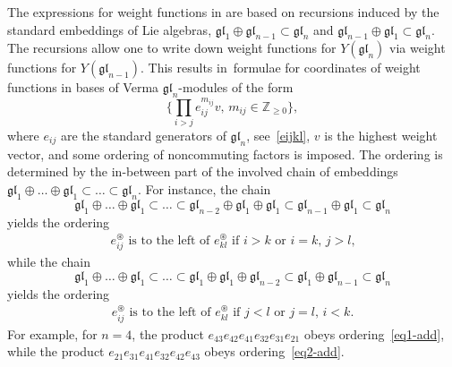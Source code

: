 \documentclass[pdftex]{sigma}
\numberwithin{equation}{section}
\begin{document}
The expressions for weight functions in \cite{TVC} are based on recursions
induced by the standard embeddings of Lie algebras,
$\mathfrak{gl}_1\oplus \mathfrak{gl}_{n-1}\subset \mathfrak{gl}_n$ and
$\mathfrak{gl}_{n-1}\oplus \mathfrak{gl}_1 \subset \mathfrak{gl}_n$. The recursions
allow one to write down weight functions for $Y(\mathfrak{gl}_n)$ via weight functions for
$Y(\mathfrak{gl}_{n-1})$. This results in~formulae for coordinates of weight functions in bases
of Verma $\mathfrak{gl}_n$-modules of the form
\begin{equation}\label{basis}
\biggl\{ \prod_{i>j} e_{ij}^{m_{ij}}v, \,
m_{ij}\in\mathbb{Z}_{\geq0}\biggr\},
\end{equation}
where $e_{ij}$ are the standard generators of $\mathfrak{gl}_n$, see~\eqref{eijkl},
$v$ is the highest weight
vector, and some ordering of noncommuting factors is imposed. The ordering is determined
by the in-between part of the involved chain of embeddings
$\mathfrak{gl}_1 \oplus\dots\oplus \mathfrak{gl}_1\subset\dots\subset\mathfrak{gl}_n$.
For instance, the chain
\[\mathfrak{gl}_1 \oplus\dots\oplus \mathfrak{gl}_1\subset
\dots\subset\mathfrak{gl}_{n-2}\oplus \mathfrak{gl}_1 \oplus \mathfrak{gl}_1 \subset
\mathfrak{gl}_{n-1}\oplus \mathfrak{gl}_1 \subset \mathfrak{gl}_n
\]
yields the ordering
\begin{gather}\label{eq1-add}
\text{$e_{ij}^\circledast$ is to the left of $e_{kl}^\circledast$ if $i>k$ or $i=k$, $j>l$,}
\end{gather}
while the chain
\[
\mathfrak{gl}_1 \oplus\dots\oplus \mathfrak{gl}_1
\subset\dots\subset\mathfrak{gl}_1 \oplus \mathfrak{gl}_1\oplus\mathfrak{gl}_{n-2} \subset
\mathfrak{gl}_1\oplus \mathfrak{gl}_{n-1}\subset \mathfrak{gl}_n
\]
yields the ordering
\begin{gather}\label{eq2-add}
\text{$e_{ij}^\circledast$ is to the left of $e_{kl}^\circledast$ if $j<l$ or $j=l$, $i<k$.}
\end{gather}
For example, for $n=4$, the product $e_{43}e_{42}e_{41}e_{32}e_{31}e_{21}$ obeys ordering~\eqref{eq1-add}, while the product $e_{21}e_{31}e_{41}e_{32}e_{42}e_{43}$ obeys ordering~\eqref{eq2-add}.
\end{document}
